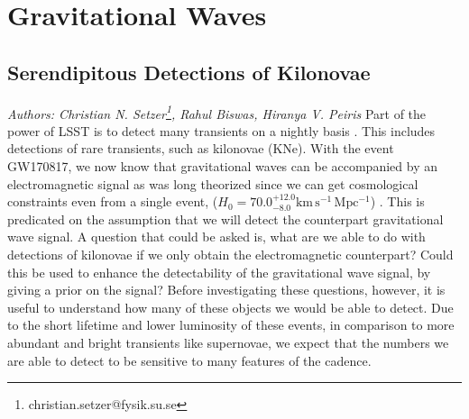 
\newcommand{\md}{\mathrm{d}}

\section{Gravitational Waves}

\subsection{Serendipitous Detections of Kilonovae}
\textit{Authors: Christian N. Setzer\footnote{christian.setzer@fysik.su.se}, Rahul Biswas, Hiranya V. Peiris}\newline
\newline
Part of the power of LSST is to detect many transients on a nightly basis \citep{LSSTScienceCollaboration2009}. This includes detections of rare transients, such as kilonovae (KNe). With the event GW170817, we now know that gravitational waves can be accompanied by an electromagnetic signal as was long theorized since we can get cosmological constraints even from a single event, ($H_0 = 70.0^{+12.0}_{-8.0} \mathrm{km\,s^{-1}\,Mpc^{-1}}$) \citep{Abbott2017}. This is predicated on the assumption that we will detect the counterpart gravitational wave signal. A question that could be asked is, what are we able to do with detections of kilonovae if we only obtain the electromagnetic counterpart? Could this be used to enhance the detectability of the
gravitational wave signal, by giving a prior on the signal? Before investigating these questions, however, it is useful to understand how many of these objects we would be able to detect. Due to the short lifetime and lower luminosity of these events, in comparison to more abundant and bright transients like supernovae, we expect that the numbers we are able to detect to be sensitive to many features of the cadence.\par

